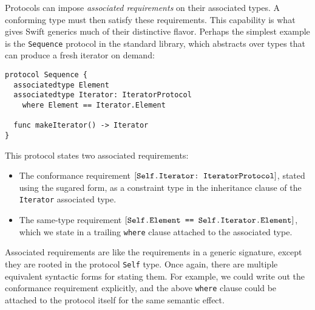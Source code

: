 \documentclass[../generics]{subfiles}
\begin{document}
Protocols can impose \emph{associated requirements} on their associated types. A conforming type must then satisfy these requirements. This capability is what gives Swift generics much of their distinctive flavor. Perhaps the simplest example is the \texttt{Sequence} protocol in the standard library, which abstracts over types that can produce a fresh iterator on demand:
\begin{Verbatim}
protocol Sequence {
  associatedtype Element
  associatedtype Iterator: IteratorProtocol
    where Element == Iterator.Element

  func makeIterator() -> Iterator
}
\end{Verbatim}
This protocol states two associated requirements:
\begin{itemize}
\item The conformance requirement $[\texttt{Self.Iterator:~IteratorProtocol}]$, stated using the sugared form, as a constraint type in the inheritance clause of the \texttt{Iterator} associated type.
\item The same-type requirement $[\texttt{Self.Element == Self.Iterator.Element}]$, which we state in a trailing \texttt{where} clause attached to the associated type.
\end{itemize}
Associated requirements are like the requirements in a generic signature, except they are rooted in the protocol \texttt{Self} type. Once again, there are multiple equivalent syntactic forms for stating them. For example, we could write out the conformance requirement explicitly, and the above \texttt{where} clause could be attached to the protocol itself for the same semantic effect.
\end{document}
